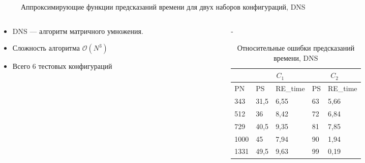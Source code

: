 \documentclass[unicode, t, 11pt]{beamer}%
\newlength{\mylen}
\begin{document}
\begin{frame}
				\begin{figure}
					\captionsetup{font=tiny, labelfont=tiny}
					\centering
					\caption{Аппроксимирующие функции предсказаний времени для двух наборов конфигураций, DNS}
				\end{figure}
				\begin{columns}[T]
					\setlength{\mylen}{0.4\textwidth}
					\begin{column}{\mylen}
						\begin{itemize}[label = \(\bullet\)]
					 		\item DNS — алгоритм матричного умножения.
					 		\item Сложность алгоритма \(\mathcal{O}(N^3)\)
					 		\item Всего 6 тестовых конфигураций
					 	\end{itemize}
					\end{column}
					\begin{column}{\dimexpr\textwidth-\mylen}
						\begin{table}
				 			\captionsetup{font=tiny, labelfont=tiny}
				 			\tiny
								\begin{tabularx}{\textwidth}{|X|X|X||X|X|}
								\hline
						             & \multicolumn{2}{c||}{\(C_1\)} & \multicolumn{2}{c|}{\(C_2\)} \\ \hline
						        PN   & PS   & RE\_time & PS & RE\_time          \\ \hline
						        343  & 31,5 & 6,55     & 63 & 5,66              \\ \hline
						        512  & 36   & 8,42     & 72 & 6,84              \\ \hline
						        729  & 40,5 & 9,35     & 81 & 7,85              \\ \hline
						        1000 & 45   & 7,94     & 90 & 1,94              \\ \hline
						        1331 & 49,5 & 9,63     & 99 & 0,19              \\ \hline
								\end{tabularx}
							\caption{Относительные ошибки предсказаний времени, DNS}
						\end{table}
					\end{column}
				\end{columns}
			\end{frame}
\end{document}
